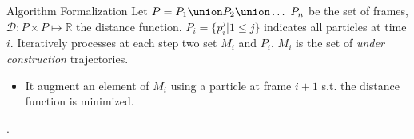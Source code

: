 \documentclass{beamer}
\begin{document}
\begin{frame}
 \begin{block}{Algorithm Formalization} 
Let $P = P_1  \union P_2 \union \ldots \ P_n$ be the set of frames, $\mathcal{D} : P \times P \mapsto\mathbb{R}$ the distance function. $P_i = \{p_i^j | 1 \leq j \}$ indicates all particles at time $i$. Iteratively processes at each step two set $M_i$ and $P_i$. $M_i$ is the set of \textit{under construction} trajectories.

\begin{itemize}
	\item It augment an element of $M_i$ using a 	particle at
	frame $i+1$ s.t. the distance function is 			minimized.
	\end{itemize}
\end{block}


.\end{frame}       
	
\end{document}
